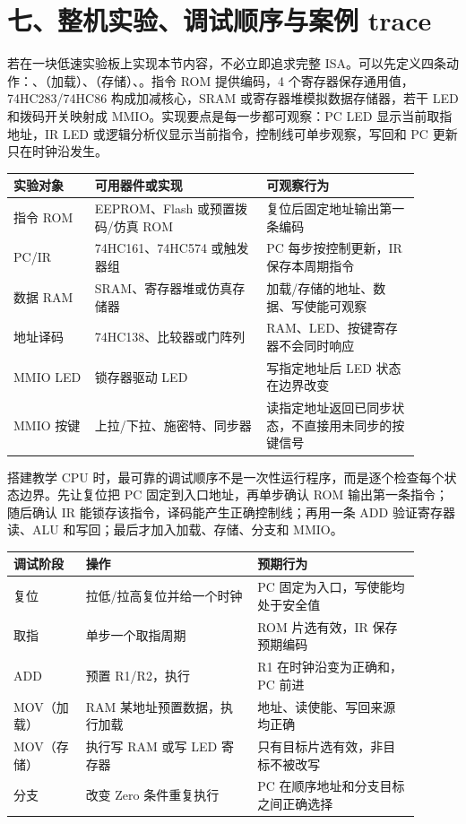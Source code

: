\section{七、整机实验、调试顺序与案例 trace}

若在一块低速实验板上实现本节内容，不必立即追求完整 ISA。可以先定义四条动作：、（加载）、（存储）、。指令 ROM 提供编码，4 个寄存器保存通用值，74HC283/74HC86 构成加减核心，SRAM 或寄存器堆模拟数据存储器，若干 LED 和拨码开关映射成 MMIO。实现要点是每一步都可观察：PC LED 显示当前取指地址，IR LED 或逻辑分析仪显示当前指令，控制线可单步观察，写回和 PC 更新只在时钟沿发生。

\begin{longtable}{L{0.18\linewidth}L{0.38\linewidth}L{0.34\linewidth}}
\toprule
实验对象 & 可用器件或实现 & 可观察行为 \\
\midrule
指令 ROM & EEPROM、Flash 或预置拨码/仿真 ROM & 复位后固定地址输出第一条编码 \\\tablerowrule
PC/IR & 74HC161、74HC574 或触发器组 & PC 每步按控制更新，IR 保存本周期指令 \\\tablerowrule
数据 RAM & SRAM、寄存器堆或仿真存储器 & 加载/存储的地址、数据、写使能可观察 \\\tablerowrule
地址译码 & 74HC138、比较器或门阵列 & RAM、LED、按键寄存器不会同时响应 \\\tablerowrule
MMIO LED & 锁存器驱动 LED & 写指定地址后 LED 状态在边界改变 \\\tablerowrule
MMIO 按键 & 上拉/下拉、施密特、同步器 & 读指定地址返回已同步状态，不直接用未同步的按键信号 \\
\bottomrule
\end{longtable}

搭建教学 CPU 时，最可靠的调试顺序不是一次性运行程序，而是逐个检查每个状态边界。先让复位把 PC 固定到入口地址，再单步确认 ROM 输出第一条指令；随后确认 IR 能锁存该指令，译码能产生正确控制线；再用一条 ADD 验证寄存器读、ALU 和写回；最后才加入加载、存储、分支和 MMIO。

\begin{longtable}{L{0.16\linewidth}L{0.38\linewidth}L{0.36\linewidth}}
\toprule
调试阶段 & 操作 & 预期行为 \\
\midrule
复位 & 拉低/拉高复位并给一个时钟 & PC 固定为入口，写使能均处于安全值 \\\tablerowrule
取指 & 单步一个取指周期 & ROM 片选有效，IR 保存预期编码 \\\tablerowrule
ADD & 预置 R1/R2，执行  & R1 在时钟沿变为正确和，PC 前进 \\\tablerowrule
MOV（加载） & RAM 某地址预置数据，执行加载 & 地址、读使能、写回来源均正确 \\\tablerowrule
MOV（存储） & 执行写 RAM 或写 LED 寄存器 & 只有目标片选有效，非目标不被改写 \\\tablerowrule
分支 & 改变 Zero 条件重复执行 & PC 在顺序地址和分支目标之间正确选择 \\
\bottomrule
\end{longtable}

